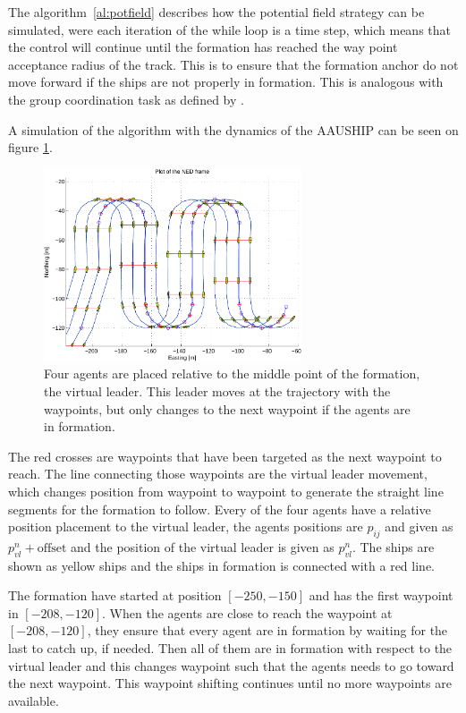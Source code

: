 \documentclass[conference]{IEEEtran}
\newcommand{\colwidth}{3in}
\begin{document}
The algorithm~\vref{al:potfield} describes how the potential field
strategy can be simulated, were each iteration of the while loop is a
time step, which means that the control will continue until the
formation has reached the way point acceptance radius of the track.
This is to ensure that the formation anchor do not move forward if the
ships are not properly in formation. This is analogous with the group
coordination task as defined by \citep{thorvaldsen}.

A simulation of the algorithm with the dynamics of the AAUSHIP can be seen on figure \ref{fig:potform}.
\begin{figure}[htbp]
  \centering
  \includegraphics[width=\colwidth]{fig/lawn-bar-formation}
  \caption{Four agents are placed relative to the middle point of the formation, the virtual leader. This leader moves at the trajectory with the waypoints, but only changes to the next waypoint if the agents are in formation.}
  \label{fig:potform}
\end{figure}
The red crosses are waypoints that have been targeted as the next waypoint to reach. The line connecting those waypoints are the virtual leader movement, which changes position from waypoint to waypoint to generate the straight line segments for the formation to follow. Every of the four agents have a relative position placement to the virtual leader, the agents positions are $p_{ij}$ and given as $p^n_{vl} + \text{offset}$ and the position of the virtual leader is given as $p^n_{vl}$. The ships are shown as yellow ships and the ships in formation is connected with a red line.

The formation have started at position $[-250,-150]$ and has the first waypoint in $[-208,-120]$. When the agents are close to reach the waypoint at $[-208,-120]$, they ensure that every agent are in formation by waiting for the last to catch up, if needed. Then all of them are in formation with respect to the virtual leader and this changes waypoint such that the agents needs to go toward the next waypoint. This waypoint shifting continues until no more waypoints are available.
\end{document}
